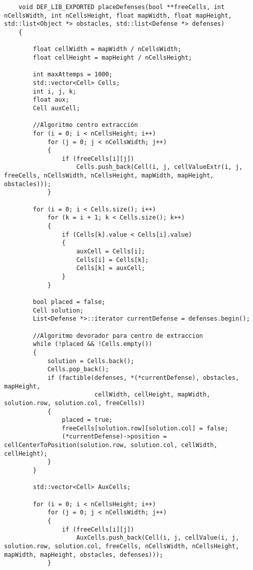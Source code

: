 \begin{lstlisting}
    void DEF_LIB_EXPORTED placeDefenses(bool **freeCells, int nCellsWidth, int nCellsHeight, float mapWidth, float mapHeight, std::list<Object *> obstacles, std::list<Defense *> defenses)
    {
    
        float cellWidth = mapWidth / nCellsWidth;
        float cellHeight = mapHeight / nCellsHeight;
    
        int maxAttemps = 1000;
        std::vector<Cell> Cells;
        int i, j, k;
        float aux;
        Cell auxCell;
    
        //Algoritmo centro extracción
        for (i = 0; i < nCellsHeight; i++)
            for (j = 0; j < nCellsWidth; j++)
            {
                if (freeCells[i][j])
                    Cells.push_back(Cell(i, j, cellValueExtr(i, j, freeCells, nCellsWidth, nCellsHeight, mapWidth, mapHeight, obstacles)));
            }
    
        for (i = 0; i < Cells.size(); i++)
            for (k = i + 1; k < Cells.size(); k++)
            {
                if (Cells[k].value < Cells[i].value)
                {
                    auxCell = Cells[i];
                    Cells[i] = Cells[k];
                    Cells[k] = auxCell;
                }
            }
    
        bool placed = false;
        Cell solution;
        List<Defense *>::iterator currentDefense = defenses.begin();
    
        //Algoritmo devorador para centro de extraccion
        while (!placed && !Cells.empty())
        {
            solution = Cells.back();
            Cells.pop_back();
            if (factible(defenses, *(*currentDefense), obstacles, mapHeight,
                         cellWidth, cellHeight, mapWidth, solution.row, solution.col, freeCells))
            {
                placed = true;
                freeCells[solution.row][solution.col] = false;
                (*currentDefense)->position = cellCenterToPosition(solution.row, solution.col, cellWidth, cellHeight);
            }
        }
    
        std::vector<Cell> AuxCells;
    
        for (i = 0; i < nCellsHeight; i++)
            for (j = 0; j < nCellsWidth; j++)
            {
                if (freeCells[i][j])
                    AuxCells.push_back(Cell(i, j, cellValue(i, j, solution.row, solution.col, freeCells, nCellsWidth, nCellsHeight, mapWidth, mapHeight, obstacles, defenses)));
            }
    

\end{lstlisting}
